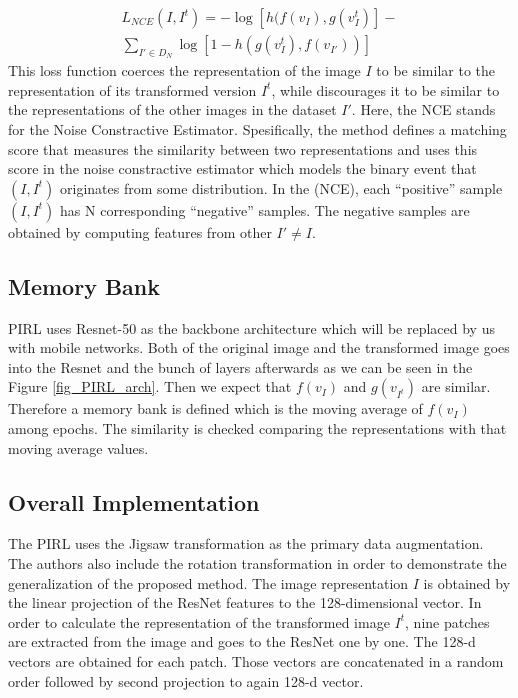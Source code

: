 \documentclass[conference]{IEEEtran}
\begin{document}
\begin{equation}\label{eq: loss_nce}
\begin{aligned}
    L_{NCE}(I,I^t) = - \log[h(f(v_I),g(v_I^t)] - 
\\
    \sum_{I' \in D_N} \log[1- h(g(v_I^t),f(v_{I'}))]
    \end{aligned}
    \end{equation}
This loss function coerces the representation of the image $I$ to be similar to the representation of its transformed version $I^t$, while discourages it to be similar to the representations of the other images in the dataset $I'$.  Here, the NCE stands for the Noise Constractive Estimator. Spesifically, the method defines a matching score that measures the similarity between two representations and uses this score in the noise constractive estimator which models the binary event that $(I,I^t)$ originates from some distribution. In the (NCE), each “positive” sample $(I, I^t )$ has N corresponding “negative” samples. The negative samples are obtained by computing features from other $I' \neq I$.

\subsection{Memory Bank}\label{membank}
PIRL uses Resnet-50 as the backbone architecture which will be replaced by us with mobile networks. Both of the original image and the transformed image goes into the Resnet and the bunch of layers afterwards as we can be seen in the Figure \ref{fig_PIRL_arch}. Then we expect that $f(v_I)$ and $g(v_{I^t})$ are similar. Therefore a memory bank is defined which is the moving average of $f(v_I)$ among epochs. The similarity is checked comparing the representations with that moving average values.

\subsection{Overall Implementation}
The PIRL uses the Jigsaw transformation as the primary data augmentation. The authors also include the rotation transformation in order to demonstrate the generalization of the proposed method. The image representation $I$ is obtained by the linear projection of the ResNet features to the 128-dimensional vector. In order to calculate the representation of the transformed image $I^t$, nine patches are extracted from the image and goes to the ResNet one by one. The 128-d vectors are obtained for each patch. Those vectors are concatenated in a random order followed by second projection to again 128-d vector.  
\end{document}
